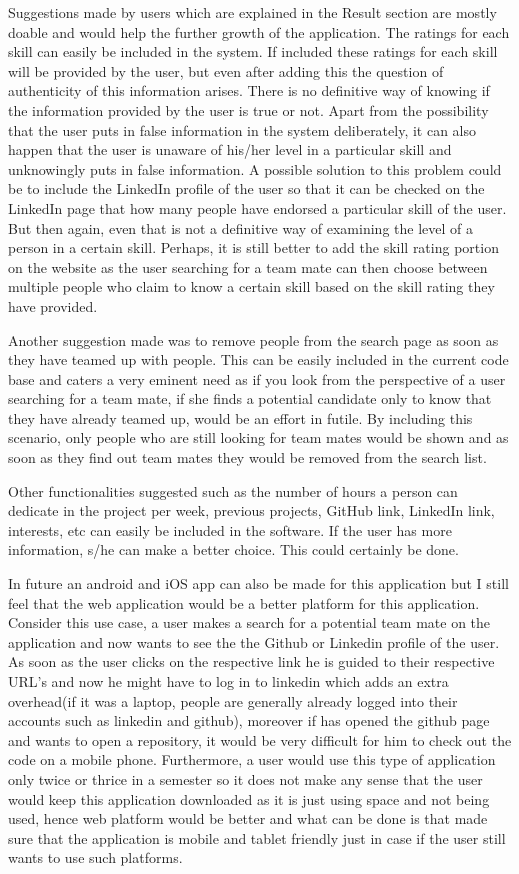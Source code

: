 \documentclass[conference]{IEEEtran}
\begin{document}
Suggestions made by users which are explained in the Result section are mostly doable and would help the further growth of the application. The ratings for each skill can easily be included in the system. If included these ratings for each skill will be provided by the user, but even after adding this the question of authenticity of this information arises. There is no definitive way of knowing if the information provided by the user is true or not. Apart from the possibility that the user puts in false information in the system deliberately, it can also happen that the user is unaware of his/her level in a particular skill and unknowingly puts in false information. A possible solution to this problem could be to include the LinkedIn profile of the user so that it can be checked on the LinkedIn page that how many people have endorsed a particular skill of the user. But then again, even that is not a definitive way of examining the level of a person in a certain skill. Perhaps, it is still better to add the skill rating portion on the website as the user searching for a team mate can then choose between multiple people who claim to know a certain skill based on the skill rating they have provided. 

Another suggestion made was to remove people from the search page as soon as they have teamed up with people. This can be easily included in the current code base and caters a very eminent need as if you look from the perspective of a user searching for a team mate, if she finds a potential candidate only to know that they have already teamed up, would be an effort in futile. By including this scenario, only people who are still looking for team mates would be shown and as soon as they find out team mates they would be removed from the search list.

Other functionalities suggested such as the number of hours a person can dedicate in the project per week, previous projects, GitHub link, LinkedIn link, interests, etc can easily be included in the software. If the user has more information, s/he can make a better choice. This could certainly be done.

In future an android and iOS app can also be made for this application but I still feel that the web application would be a better platform for this application. Consider this use case, a user makes a search for a potential team mate on the application and now wants to see the the Github or Linkedin profile of the user. As soon as the user clicks on the respective link he is guided to their respective URL's and now he might have to log in to linkedin which adds an extra overhead(if it was a laptop, people are generally already logged into their accounts such as linkedin and github), moreover if has opened the github page and wants to open a repository, it would be very difficult for him to check out the code on a mobile phone. Furthermore, a user would use this type of application only twice or thrice in a semester so it does not make any sense that the user would keep this application downloaded as it is just using space and not being used, hence web platform would be better and what can be done is that made sure that the application is mobile and tablet friendly just in case if the user still wants to use such platforms.
\end{document}
